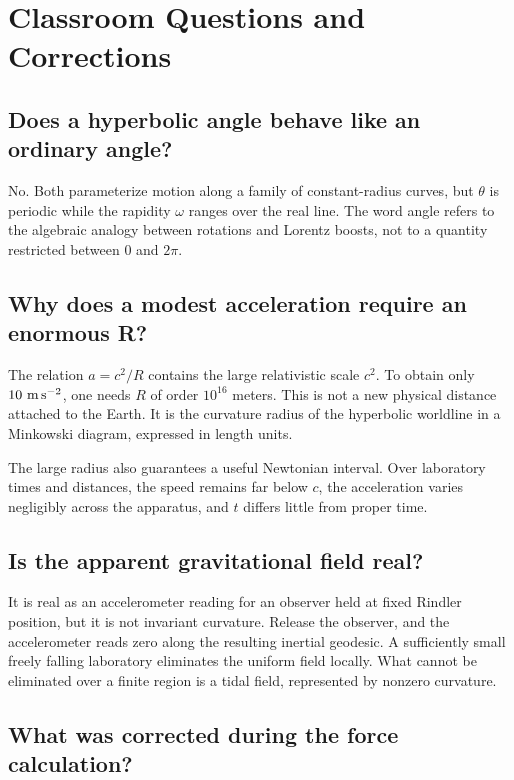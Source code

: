 \section{Classroom Questions and Corrections}

\subsection{Does a hyperbolic angle behave like an ordinary angle?}

No. Both parameterize motion along a family of constant-radius curves, but \(\theta\) is periodic while the rapidity \(\omega\) ranges over the real line. The word angle refers to the algebraic analogy between rotations and Lorentz boosts, not to a quantity restricted between \(0\) and \(2\pi\).

\subsection{Why does a modest acceleration require an enormous R?}

The relation \(a=c^2/R\) contains the large relativistic scale \(c^2\). To obtain only \(10\ {\rm m\,s^{-2}}\), one needs \(R\) of order \(10^{16}\) meters. This is not a new physical distance attached to the Earth. It is the curvature radius of the hyperbolic worldline in a Minkowski diagram, expressed in length units.

The large radius also guarantees a useful Newtonian interval. Over laboratory times and distances, the speed remains far below \(c\), the acceleration varies negligibly across the apparatus, and \(t\) differs little from proper time.

\subsection{Is the apparent gravitational field real?}

It is real as an accelerometer reading for an observer held at fixed Rindler position, but it is not invariant curvature. Release the observer, and the accelerometer reads zero along the resulting inertial geodesic. A sufficiently small freely falling laboratory eliminates the uniform field locally. What cannot be eliminated over a finite region is a tidal field, represented by nonzero curvature.

\subsection{What was corrected during the force calculation?}

